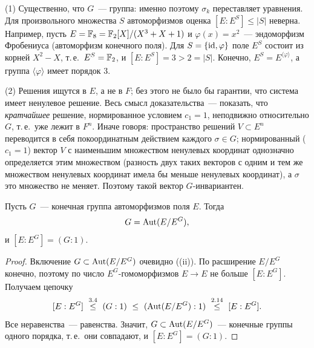 \begin{remark}[3.4a]
(1) Существенно, что $G$~--- группа: именно поэтому $\sigma_k$ переставляет уравнения. Для произвольного множества $S$
автоморфизмов оценка $[E:E^S]\le|S|$ неверна. Например, пусть $E=\mathbb F_8=\mathbb F_2[X]/(X^3+X+1)$ и $\varphi(x)=x^2$~---
эндоморфизм Фробениуса (автоморфизм конечного поля). Для $S=\{\operatorname{id},\varphi\}$ поле $E^S$ состоит из корней $X^2-X$, т.\,е.\
$E^S=\mathbb F_2$, и $[E:E^S]=3>2=|S|$. Конечно, $E^S=E^{\langle\varphi\rangle}$, а группа $\langle\varphi\rangle$ имеет порядок $3$.

(2) Решения ищутся в $E$, а не в $F$; без этого не было бы гарантии, что система имеет ненулевое решение. Весь смысл
доказательства~--- показать, что \emph{кратчайшее} решение, нормированное условием $c_1=1$, неподвижно относительно
$G$, т.\,е.\ уже лежит в $F^n$. Иначе говоря: пространство решений $V\subset E^n$ переводится в себя покоординатным
действием каждого $\sigma\in G$; нормированный ($c_1=1$) вектор $V$ с наименьшим множеством ненулевых координат
однозначно определяется этим множеством (разность двух таких векторов с одним и тем же множеством ненулевых координат
имела бы меньше ненулевых координат), а $\sigma$ это множество не меняет. Поэтому такой вектор $G$-инвариантен.
\end{remark}

\begin{corollary}[3.5]
Пусть $G$~--- конечная группа автоморфизмов поля $E$. Тогда
\[
G=\operatorname{Aut}(E/E^G),
\]
и $[E:E^G]=(G:1)$.
\end{corollary}

\begin{proof}
Включение $G\subset\operatorname{Aut}(E/E^G)$ очевидно ((ii)). По  расширение $E/E^G$ конечно, поэтому по  число
$E^G$-гомоморфизмов $E\to E$ не больше $[E:E^G]$. Получаем цепочку
\[
[E:E^G]\ \overset{\text{\rf{3.4}}}{\le}\ (G:1)\ \le\ (\Aut(E/E^G):1)\ \overset{\text{\rf{2.14}}}{\le}\ [E:E^G].
\]
Все неравенства~--- равенства. Значит, $G\subset\operatorname{Aut}(E/E^G)$~--- конечные группы одного порядка, т.\,е.\ они совпадают,
и $[E:E^G]=(G:1)$.
\end{proof}


